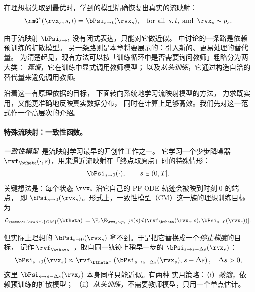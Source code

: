 在理想损失取到最优时，学到的模型精确恢复出真实的流映射：
\[
\rmG^*(\rvx_s, s, t) = \bPsi_{s\to t}(\rvx_s), \quad \text{for all }\, s,t, \text{ and }\, \rvx_s \sim p_s.
\]


由于流映射 $\bPsi_{s\to t}$ 没有闭式表达，只能对它做近似。
 中讨论的一条路是依赖预训练的扩散模型。
另一条路则是本章将要展示的：引入新的、更易处理的替代量。
为清楚起见，现有方法可以按「训练循环中是否需要询问教师」粗略分为两大类：
\emph{蒸馏}，它在训练中显式调用教师模型；
以及\emph{从头训练}，它通过构造自洽的替代量来避免调用教师。

沿着这一有原理依据的目标，
下面转向系统地学习流映射模型的方法，
力求既实用，又能更准确地反映真实数据分布，
同时在计算上足够高效。我们先对这一范式作一个高层次的介绍。
\paragraph{特殊流映射：一致性函数。}
\emph{一致性模型}~\citep{song2023consistency}是流映射学习最早的开创性工作之一。
它学习一个少步降噪器 $\rvf_\btheta(\cdot,s)$，用来逼近流映射在「终点取原点」时的特殊情形：
\[
\bPsi_{s\to 0}(\cdot), \qquad s \in (0,T].
\]
关键想法是：每个状态 $\rvx_s$ 沿它自己的 PF-ODE 轨迹会被映到时刻 $0$ 的端点，
即 $\bPsi_{s\to 0}(\rvx_s)$。形式上，一致性模型（CM）这一族的理想训练目标为~\citep{song2023consistency,songimproved,geng2024consistency,lu2024simplifying}
\begin{align}\label{eq:oracle-cm}
    \mathcal{L}_{\methodl{oracle}{CM}}(\btheta)
    := \E_{s} \E_{\rvx_s\sim p_s} \left[ w(s)  d \left(\rvf_\btheta(\rvx_s,s), \bPsi_{s\to 0}(\rvx_s)\right)\right].
\end{align}


但实际上理想的 $\bPsi_{s\to 0}(\rvx_s)$ 拿不到。于是把它替换成一个\emph{停止梯度}的目标，
记作 $\rvf_{\btheta^-}$，取自同一轨迹上稍早一步的 $\bPsi_{s\to s-\Delta s}(\rvx_s)$：
\[
\bPsi_{s\to 0}(\rvx_s) \approx \rvf_{\btheta^-} \left(\bPsi_{s\to s-\Delta s}(\rvx_s),\,s-\Delta s\right), \quad \Delta s > 0,
\]
这里 $\bPsi_{s\to s-\Delta s}(\rvx_s)$ 本身同样只能近似。有两种
实用策略：（i）\emph{蒸馏}，依赖预训练的扩散模型；
（ii）\emph{从头训练}，不需要教师模型，只用一个单点估计。

